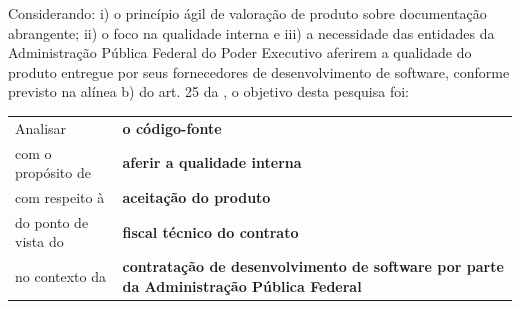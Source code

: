 Considerando: i) o princípio ágil de valoração de produto sobre documentação abrangente; ii) o foco na qualidade interna e iii) a necessidade das entidades da Administração Pública Federal do Poder Executivo aferirem a qualidade do produto entregue por seus fornecedores de desenvolvimento de software, conforme previsto na alínea b) do art. 25 da \cite{IN04:2010}, o objetivo desta pesquisa foi:


\begin{tabular}{p{3.5cm}p{8cm}}
Analisar & \textbf{o código-fonte} \\
com o propósito  de & \textbf{aferir a qualidade interna} \\
com respeito à & \textbf{aceitação do produto} \\
do ponto de vista do & \textbf{fiscal técnico do contrato} \\
no contexto da & \textbf{contratação de desenvolvimento de software por parte da Administração Pública Federal} \\
\end{tabular}